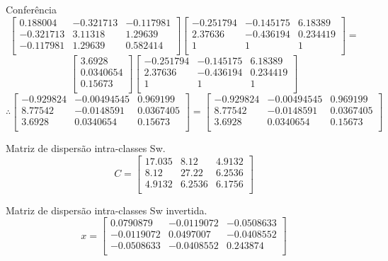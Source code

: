 \documentclass[a4paper, 11pt]{article}
\begin{document}
Conferência
$$
\begin{bmatrix}
0.188004&-0.321713&-0.117981\\
-0.321713&3.11318&1.29639\\
-0.117981&1.29639&0.582414\\
\end{bmatrix}
\begin{bmatrix}
-0.251794&-0.145175&6.18389\\
2.37636&-0.436194&0.234419\\
1&1&1\\
\end{bmatrix}
=
$$
$$
\begin{bmatrix}
3.6928\\
0.0340654\\
0.15673\\
\end{bmatrix}
\begin{bmatrix}
-0.251794&-0.145175&6.18389\\
2.37636&-0.436194&0.234419\\
1&1&1\\
\end{bmatrix}
$$
$$
\therefore
\begin{bmatrix}
-0.929824&-0.00494545&0.969199\\
8.77542&-0.0148591&0.0367405\\
3.6928&0.0340654&0.15673\\
\end{bmatrix}
=
\begin{bmatrix}
-0.929824&-0.00494545&0.969199\\
8.77542&-0.0148591&0.0367405\\
3.6928&0.0340654&0.15673\\
\end{bmatrix}
$$

Matriz de dispersão intra-classes Sw.
$$ C =
\begin{bmatrix}
17.035&8.12&4.9132\\
8.12&27.22&6.2536\\
4.9132&6.2536&6.1756\\
\end{bmatrix}
$$

Matriz de dispersão intra-classes Sw invertida.
$$ x =
\begin{bmatrix}
0.0790879&-0.0119072&-0.0508633\\
-0.0119072&0.0497007&-0.0408552\\
-0.0508633&-0.0408552&0.243874\\
\end{bmatrix}
$$
\end{document}

